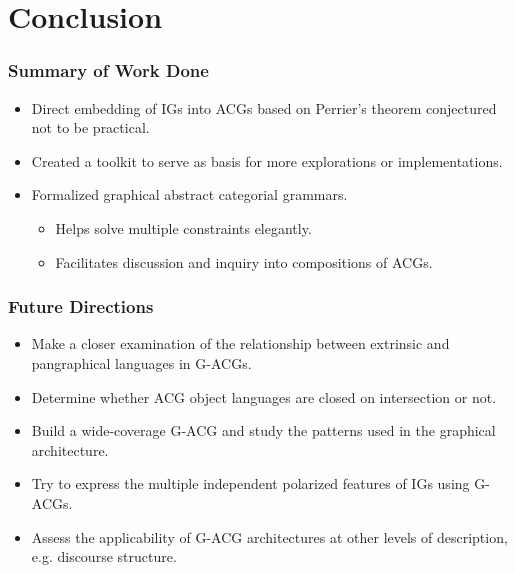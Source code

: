 \documentclass{beamer}
\begin{document}
\section{Conclusion}

\begin{frame}
  \frametitle{Summary of Work Done}

  \begin{itemize}
  \item Direct embedding of IGs into ACGs based on Perrier's theorem
    conjectured not to be practical.
  \item Created a toolkit to serve as basis for more explorations or
    implementations.
  \item Formalized graphical abstract categorial grammars.
    \begin{itemize}
    \item Helps solve multiple constraints elegantly.
    \item Facilitates discussion and inquiry into compositions of ACGs.
    \end{itemize}
  \end{itemize}
\end{frame}


\begin{frame}
  \frametitle{Future Directions}

  \begin{itemize}
  \item Make a closer examination of the relationship between extrinsic
    and pangraphical languages in G-ACGs.
  \item Determine whether ACG object languages are closed on intersection
    or not.
  \item Build a wide-coverage G-ACG and study the patterns used in the
    graphical architecture.
  \item Try to express the multiple independent polarized features of IGs
    using G-ACGs.
  \item Assess the applicability of G-ACG architectures at other levels
    of description, e.g. discourse structure.
  \end{itemize}
\end{frame}
\end{document}
